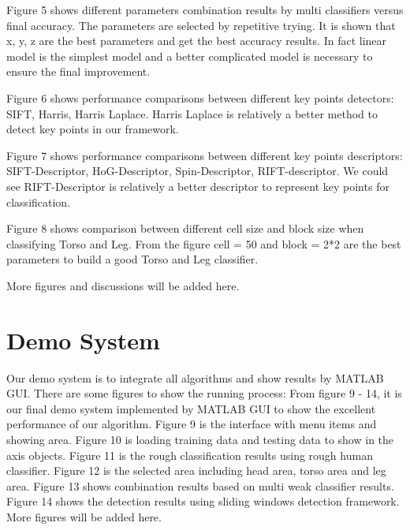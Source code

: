 \documentclass[10pt,twocolumn,letterpaper]{article}
\begin{document}
 Figure 5 shows different parameters combination results by multi classifiers versus final accuracy. The parameters are selected by repetitive trying. It is shown that x, y, z are the best parameters and get the best accuracy results. In fact linear model is the simplest model and a better complicated model is necessary to ensure the final improvement. 

 Figure 6 shows performance comparisons between different key points detectors: SIFT, Harris, Harris Laplace. Harris Laplace is relatively a better method to detect key points in our framework.

 Figure 7 shows performance comparisons between different key points descriptors: SIFT-Descriptor, HoG-Descriptor, Spin-Descriptor, RIFT-descriptor. We could see RIFT-Descriptor is relatively a better descriptor to represent key points for classification. 

 Figure 8 shows comparison between different cell size and block size when classifying Torso and Leg. From the figure cell = 50 and block = 2*2 are the best parameters to build a good Torso and Leg classifier.

More figures and discussions will be added here. 

\section{Demo System}
Our demo system is to integrate all algorithms and show results by MATLAB GUI. There are some figures to show the running process:
From figure 9 - 14, it is our final demo system implemented by MATLAB GUI to show the excellent performance of our algorithm. Figure 9 is the interface with menu items and showing area. Figure 10 is loading training data and testing data to show in the axis objects. Figure 11 is the rough classification
results using rough human classifier. Figure 12 is the selected area including head area, torso area and leg area. Figure 13 shows combination results based
on multi weak classifier results. Figure 14 shows the detection results using sliding windows detection framework.
More figures will be added here. 

\end{document}
